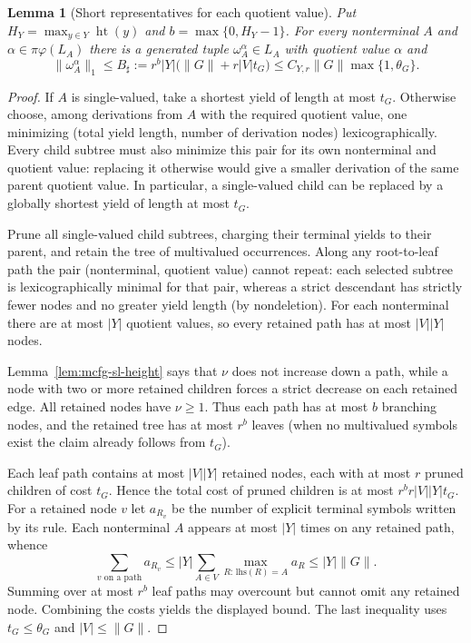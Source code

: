 \documentclass[11pt]{article}
\numberwithin{equation}{section}
\theoremstyle{plain}
\newtheorem{lemma}[theorem]{Lemma}
\theoremstyle{definition}
\theoremstyle{remark}
\theoremstyle{plain}
\begin{document}
\begin{lemma}[Short representatives for each quotient value]
\label{lem:mcfg-sl-short-value}
Put $H_Y=\max_{y\in Y}\operatorname{ht}(y)$ and
$b=\max\{0,H_Y-1\}$. For every nonterminal $A$ and
$\alpha\in\pi\varphi(L_A)$ there is a generated tuple
$\omega_A^\alpha\in L_A$ with quotient value $\alpha$ and
\[
 \|\omega_A^\alpha\|_1\le
 B_\sharp:=
 r^b|Y|\bigl(\|G\|+r|V|t_G\bigr)
 \le C_{Y,r}\|G\|\max\{1,\theta_G\}.
\]
\end{lemma}
\begin{proof}
If $A$ is single-valued, take a shortest yield of length at
most $t_G$. Otherwise choose, among derivations from $A$
with the required quotient value, one minimizing
(total yield length, number of derivation nodes)
lexicographically. Every child subtree must also minimize
this pair for its own nonterminal and quotient value:
replacing it otherwise would give a smaller derivation of
the same parent quotient value. In particular, a
single-valued child can be replaced by a globally shortest
yield of length at most $t_G$.

Prune all single-valued child subtrees, charging their
terminal yields to their parent, and retain the tree of
multivalued occurrences. Along any root-to-leaf path the
pair (nonterminal, quotient value) cannot repeat:
each selected subtree is lexicographically minimal for
that pair, whereas a strict descendant has strictly fewer
nodes and no greater yield length (by nondeletion).
For each nonterminal there are at most $|Y|$ quotient
values, so every retained path has at most $|V||Y|$ nodes.

Lemma~\ref{lem:mcfg-sl-height} says that $\nu$ does not
increase down a path, while a node with two or more
retained children forces a strict decrease on each retained
edge. All retained nodes have $\nu\ge1$.
Thus each path has at most $b$ branching nodes, and the
retained tree has at most $r^b$ leaves (when no
multivalued symbols exist the claim already follows
from $t_G$).

Each leaf path contains at most $|V||Y|$ retained nodes,
each with at most $r$ pruned children of cost $t_G$.
Hence the total cost of pruned children is at most
$r^b r|V||Y|t_G$.
For a retained node $v$ let $a_{R_v}$ be the number of
explicit terminal symbols written by its rule.
Each nonterminal $A$ appears at most $|Y|$ times on any
retained path, whence
\[
 \sum_{v\text{ on a path}}a_{R_v}
 \le |Y|\sum_{A\in V}\max_{R:\,\mathrm{lhs}(R)=A}a_R
 \le |Y|\|G\|.
\]
Summing over at most $r^b$ leaf paths may overcount but
cannot omit any retained node. Combining the costs yields
the displayed bound. The last inequality uses
$t_G\le\theta_G$ and $|V|\le\|G\|$.
\end{proof}
\end{document}
